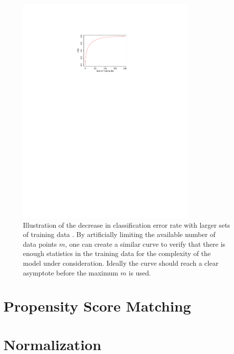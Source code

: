 \begin{figure}
\centering
\includegraphics[width=0.8\textwidth]{figures/ml/acc_vs_m}
\caption{
Illustration of the decrease in classification error rate
with larger sets of training data \cite{HastieTF09}.
By artificially limiting the available number of data points $m$,
one can create a similar curve to verify that
there is enough statistics in the training data
for the complexity of the model under consideration.
Ideally the curve should reach a clear asymptote before the maximum $m$ is used.
}
\label{fig:enough_training_data}
\end{figure}

\section{Propensity Score Matching}
\label{ml_general:propensity}

\section{Normalization}
\label{ml_general:normalization}

